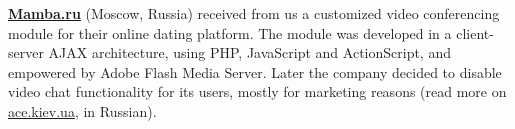 
\textbf{\href{http://www.mamba.ru}{Mamba.ru}} (Moscow, Russia)
received from us a customized video conferencing module for their
online dating platform. The module was developed in
a client-server AJAX architecture, using PHP, JavaScript and
ActionScript, and empowered by Adobe Flash Media Server.
Later the company decided to disable video chat functionality
for its users, mostly for marketing reasons (read more on 
\href{http://ace.kiev.ua/mamba-otkazalas-ot-video-chatov/}{ace.kiev.ua}, in Russian).
